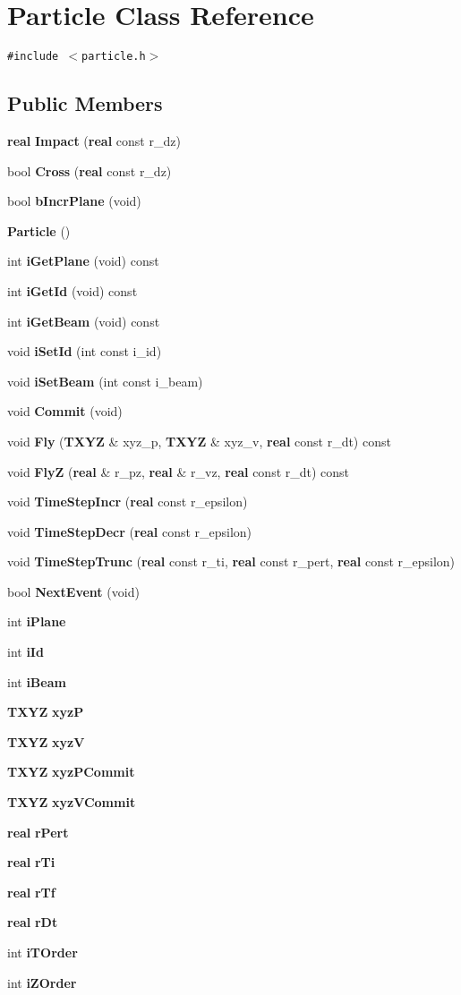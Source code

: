\section{Particle  Class Reference}
\label{Particle}


{\tt \#include $<$particle.h$>$}

\subsection*{Public Members}
\begin{CompactItemize}
\item 
{\bf real} {\bf Impact} ({\bf real} const r\_\-dz)
\item 
bool {\bf Cross} ({\bf real} const r\_\-dz)
\item 
bool {\bf b\-Incr\-Plane} (void)
\item 
{\bf Particle} ()
\item 
int {\bf i\-Get\-Plane} (void) const
\item 
int {\bf i\-Get\-Id} (void) const
\item 
int {\bf i\-Get\-Beam} (void) const
\item 
void {\bf i\-Set\-Id} (int const i\_\-id)
\item 
void {\bf i\-Set\-Beam} (int const i\_\-beam)
\item 
void {\bf Commit} (void)
\item 
void {\bf Fly} ({\bf TXYZ} \& xyz\_\-p, {\bf TXYZ} \& xyz\_\-v, {\bf real} const r\_\-dt) const
\item 
void {\bf Fly\-Z} ({\bf real} \& r\_\-pz, {\bf real} \& r\_\-vz, {\bf real} const r\_\-dt) const
\item 
void {\bf Time\-Step\-Incr} ({\bf real} const r\_\-epsilon)
\item 
void {\bf Time\-Step\-Decr} ({\bf real} const r\_\-epsilon)
\item 
void {\bf Time\-Step\-Trunc} ({\bf real} const r\_\-ti, {\bf real} const r\_\-pert, {\bf real} const r\_\-epsilon)
\item 
bool {\bf Next\-Event} (void)
\item 
int {\bf i\-Plane}
\item 
int {\bf i\-Id}
\item 
int {\bf i\-Beam}
\item 
{\bf TXYZ} {\bf xyz\-P}
\item 
{\bf TXYZ} {\bf xyz\-V}
\item 
{\bf TXYZ} {\bf xyz\-PCommit}
\item 
{\bf TXYZ} {\bf xyz\-VCommit}
\item 
{\bf real} {\bf r\-Pert}
\item 
{\bf real} {\bf r\-Ti}
\item 
{\bf real} {\bf r\-Tf}
\item 
{\bf real} {\bf r\-Dt}
\item 
int {\bf i\-TOrder}
\item 
int {\bf i\-ZOrder}
\end{CompactItemize}
